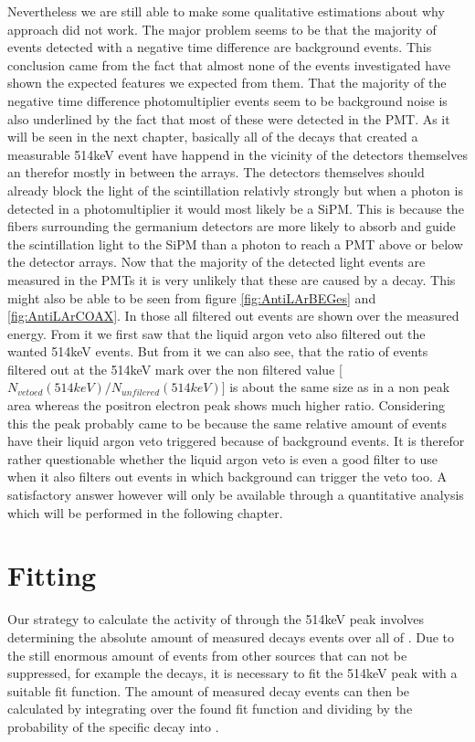 Nevertheless we are still able to make some qualitative estimations about why approach did not work. 
The major problem seems to be that the majority of events detected with a negative time difference are background events.
This conclusion came from the fact that almost none of the events investigated have shown the expected features we expected from them. 
That the majority of the negative time difference photomultiplier events seem to be background noise is also underlined by the fact that most of these were detected in the PMT. 
As it will be seen in the next chapter, basically all of the decays that created a measurable 514keV event have happend in the vicinity of the detectors themselves an therefor mostly in between the arrays.
The detectors themselves should already block the light of the scintillation relativly strongly but when a photon is detected in a photomultiplier it would most likely be a SiPM.
This is because the fibers surrounding  the germanium detectors are more likely to absorb and guide the scintillation light to the SiPM than a photon to reach a PMT above or below the detector arrays.
Now that the majority of the detected light events are measured in the PMTs it is very unlikely that these are caused by a \Kr decay.
This might also be able to be seen from figure \ref{fig:AntiLArBEGes} and \ref{fig:AntiLArCOAX}.
In those all filtered out events are shown over the measured energy.
From it we first saw that the liquid argon veto also filtered out the wanted 514keV events.
But from it we can also see, that the ratio of events filtered out at the 514keV mark over the non filtered value [$N_{\unit{vetoed}}(514\unit{keV})/N_{\unit{unfilered}}(514\unit{keV})]$ is about the same size as in a non peak area whereas the positron electron peak shows much higher ratio.
Considering this the peak probably came to be because the same relative amount of events have their liquid argon veto triggered because of background events.
It is therefor rather questionable whether the liquid argon veto is even a good filter to use when it also filters out events in which background can trigger the veto too.
A satisfactory answer however will only be available through a quantitative analysis which will be performed in the following chapter.
\\

\section{Fitting}
\label{sec:Fitting}

Our strategy to calculate the activity of \Kr through the 514keV peak involves determining the absolute amount of measured \Kr decays events over all of \PII.
Due to the still enormous amount of events from other sources that can not be suppressed, for example the  decays, it is necessary to fit the 514keV peak with a suitable fit function.
The amount of measured \Kr decay events can then be calculated by integrating over the found fit function and dividing by the probability of the specific decay into .
\\

